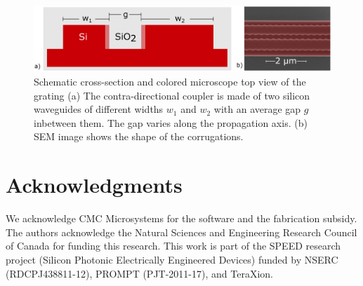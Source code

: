 \documentclass[letterpaper,10pt]{article}
\begin{document}
\begin{figure}[htbp]
	\centering
	\includegraphics[width=.99\columnwidth]{CrossAndTop}
	\caption{Schematic cross-section and colored microscope top view of the grating (a) The contra-directional coupler is made of two silicon waveguides of different widths $w_1$ and $w_2$ with an average gap $g$ inbetween them. The gap varies along the propagation axis. (b) SEM image shows the shape of the corrugations. }
	\label{fig:bandTuneSimu}
\end{figure} 

















\section*{Acknowledgments}
We acknowledge CMC Microsystems for the  software and the fabrication subsidy. The authors acknowledge the Natural Sciences and Engineering Research Council of Canada for funding this research. This work is part of the SPEED research project (Silicon Photonic Electrically Engineered Devices) funded by NSERC (RDCPJ438811-12), PROMPT (PJT-2011-17), and TeraXion.



\end{document}
